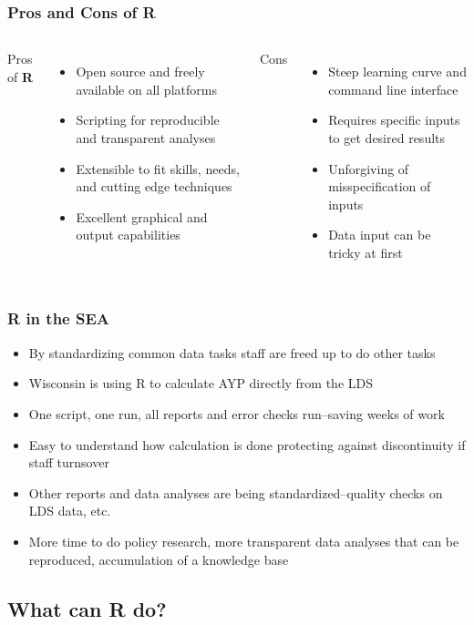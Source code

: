 \documentclass[12pt,handout]{beamer}
\begin{document}
\begin{frame}
\frametitle{Pros and Cons of R}
  \begin{columns}
  Pros of \textbf{R}
  \begin{itemize}
  \item Open source and freely available on all platforms
  \item Scripting for reproducible and transparent analyses
  \item Extensible to fit skills, needs, and cutting edge techniques
  \item Excellent graphical and output capabilities
  \end{itemize}
  Cons
  \begin{itemize}
  \item Steep learning curve and command line interface
  \item Requires specific inputs to get desired results
  \item Unforgiving of misspecification of inputs
  \item Data input can be tricky at first
  \end{itemize}
  \end{columns}
\end{frame}

\begin{frame}
\frametitle{R in the SEA}
\begin{itemize}
  \item By standardizing common data tasks staff are freed up to do other tasks
  \pause
  \item Wisconsin is using R to calculate AYP directly from the LDS
  \pause
  \item One script, one run, all reports and error checks run--saving weeks of work
  \pause
  \item Easy to understand how calculation is done protecting against discontinuity if staff turnsover
  \pause
  \item Other reports and data analyses are being standardized--quality checks on LDS data, etc.
  \pause
  \item More time to do policy research, more transparent data analyses that can be reproduced, accumulation of a knowledge base 
\end{itemize}
\end{frame}
  


\subsection{What can R do?}
\end{document}
